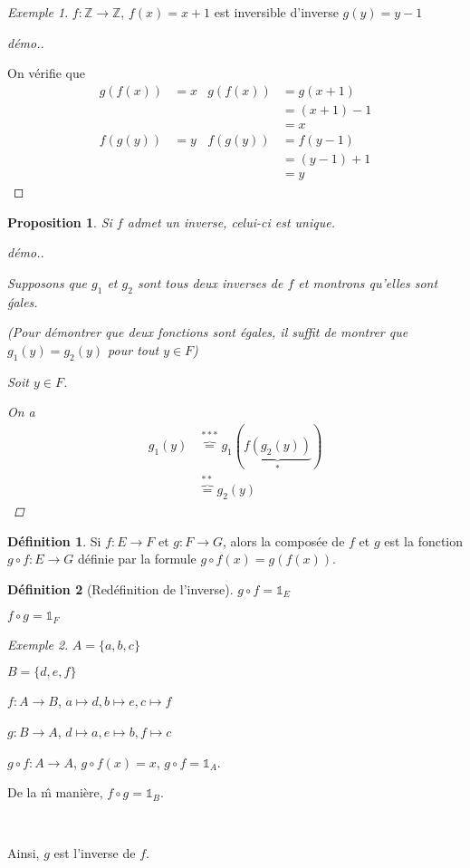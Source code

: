\documentclass{report}
\newtheorem*{prop}{Proposition}
\theoremstyle{definition}
\newtheorem*{defin}{D\'efinition}
\theoremstyle{remark}
\newtheorem*{exem}{Exemple}
\begin{document}
	\begin{exem}
		$f:\mathbb{Z} \to \mathbb{Z}$, $f(x)=x+1$ est inversible d'inverse $g(y)=y-1$

		\begin{proof}[d\'emo.]
			~

			On v\'erifie que
			\begin{align*}
				g(f(x))&= x& g(f(x))&= g(x+1)\\
				&&&= (x+1)-1\\
				&&&= x\\
				f(g(y))&= y& f(g(y))&= f(y-1)\\
				&&&= (y-1)+1\\
				&&&= y
			\end{align*}
		\end{proof}
	\end{exem}

	\begin{prop}
		Si $f$ admet un inverse, celui-ci est unique.

		\begin{proof}[d\'emo.]
			~

			Supposons que $g_1$ et $g_2$ sont tous deux inverses de $f$ et montrons qu'elles sont \'gales.

			(Pour d\'emontrer que deux fonctions sont \'egales, il suffit de montrer que $g_1(y)=g_2(y)$ pour tout $y \in F$)

			Soit $y \in F$.

			On a
			\begin{align*}
				g_1(y)&\overbrace{=}^{***} g_1(\underbrace{f(g_2(y))}_{*})\\
				&\overbrace{=}^{**} g_2(y)
			\end{align*}
		\end{proof}
	\end{prop}

	\begin{defin}
		Si $f:E \to F$ et $g:F \to G$, alors la compos\'ee de $f$ et $g$ est la fonction $g \circ f:E \to G$ d\'efinie par la formule $g \circ f(x)=g(f(x))$.
	\end{defin}

	\begin{defin}[Red\'efinition de l'inverse]
		$g \circ f=\mathds{1}_E$

		$f \circ g=\mathds{1}_F$
	\end{defin}

	\begin{exem}
		$A=\{a,b,c\}$

		$B=\{d,e,f\}$

		$f:A \to B$, $a \mapsto d, b \mapsto e, c \mapsto f$

		$g:B \to A$, $d \mapsto a, e \mapsto b, f \mapsto c$

		$g \circ f:A \to A$, $g \circ f(x)=x$, $g \circ f=\mathds{1}_A$.

		De la \^m mani\`ere, $f \circ g=\mathds{1}_B$.

		~

		Ainsi, $g$ est l'inverse de $f$.
	\end{exem}
\end{document}
